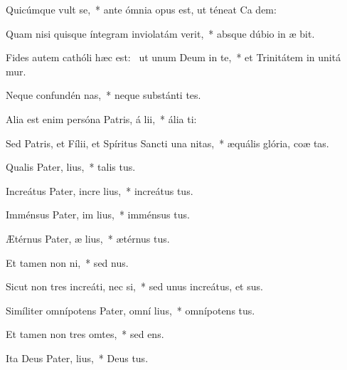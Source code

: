 \item Quicúmque vult  se,~* ante ómnia opus est, ut téneat Ca dem:
\item Quam nisi quisque íntegram inviolatám verit,~* absque dúbio in æ bit.
\item Fides autem cathóli hæc est:~\pscross{} ut unum Deum in te,~* et Trinitátem in unitá mur.
\item Neque confundén nas,~* neque substánti tes.
\item Alia est enim persóna Patris, á lii,~* ália  ti:
\item Sed Patris, et Fílii, et Spíritus Sancti una  nitas,~* æquális glória, coæ tas.
\item Qualis Pater,  lius,~* talis  tus.
\item Increátus Pater, incre lius,~* increátus  tus.
\item Imménsus Pater, im lius,~* imménsus  tus.
\item Ætérnus Pater, æ lius,~* ætérnus  tus.
\item Et tamen non  ni,~* sed  nus.
\item Sicut non tres increáti, nec  si,~* sed unus increátus, et  sus.
\item Simíliter omnípotens Pater, omní lius,~* omnípotens  tus.
\item Et tamen non tres omtes,~* sed  ens.
\item Ita Deus Pater,  lius,~* Deus  tus.
